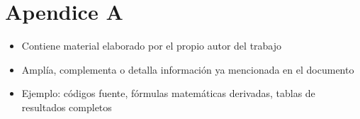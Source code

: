 \chapter*{Apendice A}
\begin{itemize}
    \item Contiene material elaborado por el propio autor del trabajo

    \item Amplía, complementa o detalla información ya mencionada en el documento

    \item Ejemplo: códigos fuente, fórmulas matemáticas derivadas, tablas de resultados completos
\end{itemize}

